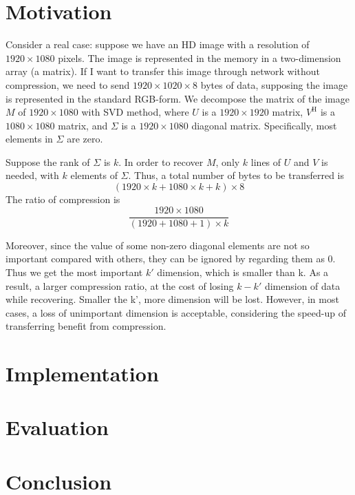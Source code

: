 \documentclass{article}
\begin{document}
    \section{Motivation}
        \par
        Consider a real case:
        suppose we have an HD image with a resolution of $1920 \times 1080$ pixels.
        The image is represented in the memory in a two-dimension array (a matrix).
        If I want to transfer this image through network without compression,
        we need to send $1920 \times 1020 \times 8$ bytes of data,
        supposing the image is represented in the standard RGB-form.
        We decompose the matrix of the image $M$ of $1920 \times 1080$ with SVD method,
        where $U$ is a $1920 \times 1920$ matrix,
        $V^\mathrm{ H }$ is a $1080 \times 1080$ matrix,
        and $\Sigma$ is a $1920 \times 1080$ diagonal matrix.
        Specifically, most elements in $\Sigma$ are zero.
        \par
        Suppose the rank of $\Sigma$ is $k$.
        In order to recover $M$, only $k$ lines of $U$ and $V$ is needed,
        with $k$ elements of $\Sigma$.
        Thus, a total number of bytes to be
        transferred is $$(1920 \times k + 1080 \times k + k) \times 8$$
        The ratio of compression is $$\frac{1920 \times 1080}{(1920 + 1080 + 1) \times k} $$
        \par
        Moreover, since the value of some non-zero diagonal elements are not so important
        compared with others, they can be ignored by regarding them as 0.
        Thus we get the most important $k'$ dimension,
        which is smaller than k.
        As a result, a larger compression ratio,
        at the cost of losing $k - k'$ dimension of data while recovering.
        Smaller the k’, more dimension will be lost.
        However, in most cases, a loss of unimportant dimension is acceptable,
        considering the speed-up of transferring benefit from compression.
    

    \section{Implementation}

    \section{Evaluation}

    \section{Conclusion}
\end{document}
